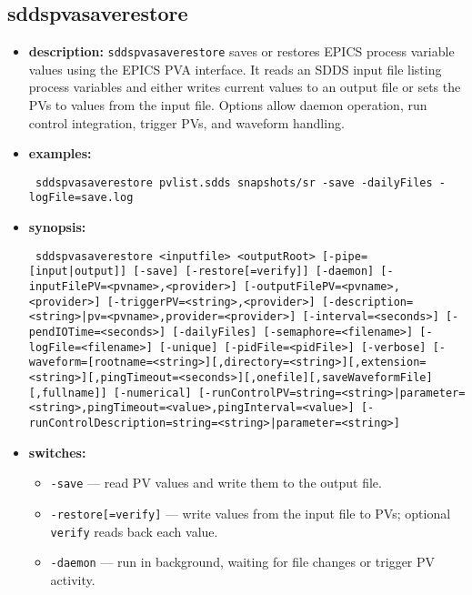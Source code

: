\newpage
\subsection{sddspvasaverestore}
\label{sddspvasaverestore}

\begin{itemize}
\item {\bf description:}
  \verb+sddspvasaverestore+ saves or restores EPICS process variable values using the EPICS PVA
  interface. It reads an SDDS input file listing process variables and either writes current
  values to an output file or sets the PVs to values from the input file. Options allow daemon
  operation, run control integration, trigger PVs, and waveform handling.
\item {\bf examples:}
\begin{flushleft}{\tt
sddspvasaverestore pvlist.sdds snapshots/sr -save -dailyFiles -logFile=save.log\\
}\end{flushleft}
\item {\bf synopsis:}
\begin{flushleft}{\tt
sddspvasaverestore <inputfile> <outputRoot> [-pipe=[input|output]]\
  [-save] [-restore[=verify]]\
  [-daemon]\
    [-inputFilePV=<pvname>,<provider>] [-outputFilePV=<pvname>,<provider>]\
    [-triggerPV=<string>,<provider>]\
    [-description=<string>|pv=<pvname>,provider=<provider>]\
  [-interval=<seconds>] [-pendIOTime=<seconds>]\
  [-dailyFiles] [-semaphore=<filename>] [-logFile=<filename>]\
  [-unique] [-pidFile=<pidFile>] [-verbose]\
  [-waveform=[rootname=<string>][,directory=<string>][,extension=<string>][,pingTimeout=<seconds>][,onefile][,saveWaveformFile][,fullname]]\
  [-numerical]\
  [-runControlPV={string=<string>|parameter=<string>},pingTimeout=<value>,pingInterval=<value>]\
  [-runControlDescription={string=<string>|parameter=<string>}]
}\end{flushleft}
\item {\bf switches:}
  \begin{itemize}
  \item {\tt -save} --- read PV values and write them to the output file.
  \item {\tt -restore[=verify]} --- write values from the input file to PVs; optional {\tt verify} reads back each value.
  \item {\tt -daemon} --- run in background, waiting for file changes or trigger PV activity.

\end{itemize}
\end{itemize}
